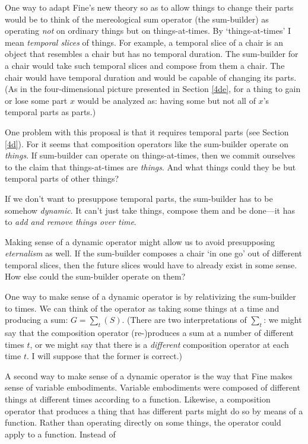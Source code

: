 \documentclass[11pt]{article}
\begin{document}
\begin{spacing}{1.5}
One way to adapt Fine's new theory so as to allow things to change
their parts would be to think of the mereological sum operator (the
sum-builder) as operating {\em not} on ordinary things but on
things-at-times.  By `things-at-times' I mean {\em temporal slices} of
things.  For example, a temporal slice of a chair is an object that
resembles a chair but has no temporal duration.  The sum-builder for a
chair would take such temporal slices and compose from them a chair.
The chair would have temporal duration and would be capable of
changing its parts.  (As in the four-dimensional picture presented in
Section \ref{4de}, for a thing to gain or lose some part $x$ would be
analyzed as: having some but not all of $x$'s temporal parts as
parts.)

One problem with this proposal is that it requires temporal parts (see
Section \ref{4d}).  For it seems that composition operators like the
sum-builder operate on {\em things}.  If sum-builder can operate on
things-at-times, then we commit ourselves to the claim that
things-at-times are {\em things}.  And what things could they be but
temporal parts of other things?

If we don't want to presuppose temporal parts, the sum-builder has to
be somehow \emph{dynamic}. It can't just take things, compose them and
be done---it has to \emph{add and remove things over time}.

Making sense of a dynamic operator might allow us to avoid
presupposing {\em eternalism} as well.  If the sum-builder composes a
chair `in one go' out of different temporal slices, then the future
slices would have to already exist in some sense.  How else could the
sum-builder operate on them?

One way to make sense of a dynamic operator is by relativizing the
sum-builder to times.  We can think of the operator as taking some
things at a time and producing a sum: $G = \sum _{t} (S)$.  (There are
two interpretations of $\sum _{t}$: we might say that the composition
operator (re-)produces a sum at a number of different times $t$, or we
might say that there is a {\em different} composition operator at each
time $t$.  I will suppose that the former is correct.)

A second way to make sense of a dynamic operator is the way that Fine
makes sense of variable embodiments.  Variable embodiments were
composed of different things at different times according to a
function.  Likewise, a composition operator that produces a thing that
has different parts might do so by means of a function.  Rather than
operating directly on some things, the operator could apply to a
function.  Instead of


\end{spacing}
\end{document}
